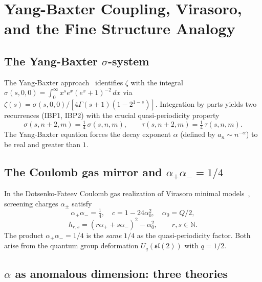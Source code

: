 \documentclass[%
 aip,
 amsmath,amssymb,
 reprint,%
]{revtex4-1}
\theoremstyle{plain}
\theoremstyle{definition}
\newcommand{\N}{\mathbb{N}}
\begin{document}
\section{Yang-Baxter Coupling, Virasoro, and the Fine Structure Analogy}
\label{sec:virasoro}

\subsection{The Yang-Baxter $\sigma$-system}

The Yang-Baxter approach~\cite{companion} identifies $\zeta$ with the integral
$\sigma(s,0,0) = \int_0^\infty x^s e^x(e^x+1)^{-2}\,dx$ via
$\zeta(s) = \sigma(s,0,0)/[4\Gamma(s+1)(1-2^{1-s})]$.
Integration by parts yields two recurrences (IBP1, IBP2) with the crucial
quasi-periodicity property
\[
\sigma(s, n+2, m) = \tfrac{1}{4}\,\sigma(s,n,m), \qquad
\tau(s, n+2, m) = \tfrac{1}{4}\,\tau(s,n,m).
\]
The Yang-Baxter equation forces the decay exponent $\alpha$ (defined by
$a_n \sim n^{-\alpha}$) to be real and greater than $1$.

\subsection{The Coulomb gas mirror and $\alpha_+\alpha_- = 1/4$}

In the Dotsenko-Fateev Coulomb gas realization of Virasoro minimal
models~\cite{DotsenkoFateev1984}, screening charges $\alpha_\pm$ satisfy
\[
\alpha_+\alpha_- = \tfrac14, \quad c = 1 - 24\alpha_0^2, \quad \alpha_0 = Q/2,
\]
\[
h_{r,s} = (r\alpha_+ + s\alpha_-)^2 - \alpha_0^2, \qquad r,s \in \N.
\]
The product $\alpha_+\alpha_- = 1/4$ is the \emph{same} $1/4$ as the
quasi-periodicity factor. Both arise from the quantum group deformation
$U_q(\mathfrak{sl}(2))$ with $q = 1/2$.

\subsection{$\alpha$ as anomalous dimension: three theories}

\begin{center}
\renewcommand{\arraystretch}{1.4}
\end{center}
\end{document}

